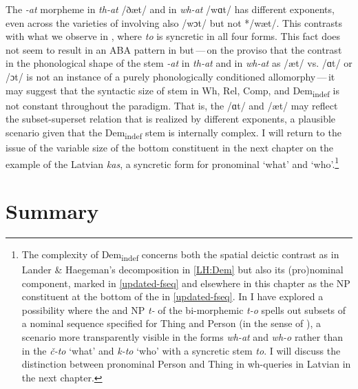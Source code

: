 \noindent The \textit{-at} morpheme in \textit{th-at} /ðæt/ and in \textit{wh-at} /wɑt/ has different exponents, even across the varieties of  involving also /wɔt/ but not */wæt/. This contrasts with what we observe in , where \textit{to} is syncretic in all four forms. This fact does not seem to result in an ABA pattern  in  but\,---\,on the proviso that the contrast in the phonological shape of the stem \textit{-at} in \textit{th-at} and in \textit{wh-at} as /æt/ vs. /ɑt/ or /ɔt/ is not an instance of a purely phonologically conditioned  allomorphy\,---\,it may suggest that the syntactic size of stem in Wh, Rel, Comp, and Dem\textsubscript{indef} is not constant throughout the  paradigm. That is, the  /ɑt/ and /æt/ may reflect the subset-superset relation that is realized by different exponents, a plausible scenario given that the Dem\textsubscript{indef} stem is internally complex. I will return to the issue of the variable size of the bottom constituent in the next chapter on the example of the Latvian \textit{kas}, a syncretic form for pronominal `what' and `who'.\footnote{\label{FN:differentbottoms}The complexity of Dem\textsubscript{indef} concerns both the spatial deictic contrast as in Lander \& Haegeman's \citeyearpar{Lander-Haegeman2016} decomposition in \ref{LH:Dem} but also its (pro)nominal component, marked in \ref{updated-fseq} and elsewhere in this chapter as the NP constituent at the bottom of the  in \ref{updated-fseq}. In \cite{Wiland-PSiCL} I have explored a possibility where the  and  NP \textit{t-} of the bi-morphemic \textit{t-o} spells out subsets of a nominal sequence specified for Thing and Person (in the sense of \citeauthor{Cysouw2004} \citeyear{Cysouw2004,Cysouw2005}), a scenario more transparently visible in the  forms \textit{wh-at} and \textit{wh-o} rather than in the  \textit{\v{c}-to} `what' and \textit{k-to} `who' with a syncretic stem \textit{to}. I will discuss the distinction between pronominal Person and Thing in wh-queries in Latvian in the next chapter.
} %



\section{Summary}

